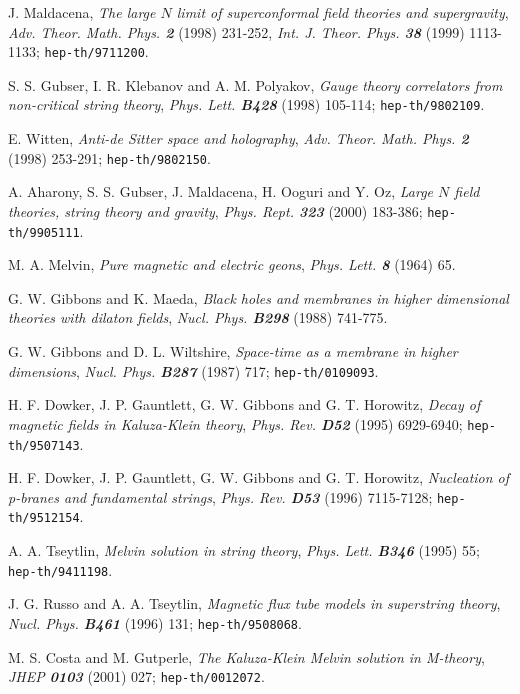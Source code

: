 \documentclass[a4paper,aps,nofootinbib,showpacs,preprint]{revtex4}
\begin{document}
\begin{thebibliography}{99}
    J. Maldacena,
    {\sl The large $N$ limit of superconformal field theories and
         supergravity},
    {\it Adv. Theor. Math. Phys. \bf 2} (1998) 231-252,
    {\it Int. J. Theor. Phys. \bf 38} (1999) 1113-1133;
    {\tt hep-th/9711200}.

    S. S. Gubser, I. R. Klebanov and A. M. Polyakov,
    {\sl Gauge theory correlators from non-critical string theory},
    {\it Phys. Lett. \bf B428} (1998) 105-114;
    {\tt hep-th/9802109}.

    E. Witten,
    {\sl Anti-de Sitter space and holography},
    {\it Adv. Theor. Math. Phys. \bf 2} (1998) 253-291;
    {\tt hep-th/9802150}.

    A. Aharony, S. S. Gubser, J. Maldacena, H. Ooguri and Y. Oz,
    {\sl Large $N$ field theories, string theory and gravity},
    {\it Phys. Rept. \bf 323} (2000) 183-386;
    {\tt hep-th/9905111}.

    M. A. Melvin,
    {\sl Pure magnetic and electric geons},
    {\it Phys. Lett. \bf 8} (1964) 65.

    G. W. Gibbons and K. Maeda,
    {\sl Black holes and membranes in higher dimensional theories
         with dilaton fields},
    {\it Nucl. Phys. \bf B298} (1988) 741-775.

    G. W. Gibbons and D. L. Wiltshire,
    {\sl Space-time as a membrane in higher dimensions},
    {\it Nucl. Phys. \bf B287} (1987) 717;
    {\tt hep-th/0109093}.

    H. F. Dowker, J. P. Gauntlett, G. W. Gibbons and G. T. Horowitz,
    {\sl Decay of magnetic fields in Kaluza-Klein theory},
    {\it Phys. Rev. \bf D52} (1995) 6929-6940;
    {\tt hep-th/9507143}.

    H. F. Dowker, J. P. Gauntlett, G. W. Gibbons and G. T. Horowitz,
    {\sl Nucleation of p-branes and fundamental strings},
    {\it Phys. Rev. \bf D53} (1996) 7115-7128;
    {\tt hep-th/9512154}.

    A. A. Tseytlin,
    {\sl Melvin solution in string theory},
    {\it Phys. Lett. \bf B346} (1995) 55;
    {\tt hep-th/9411198}.

    J. G. Russo and A. A. Tseytlin,
    {\sl Magnetic flux tube models in superstring theory},
    {\it Nucl. Phys. \bf B461} (1996) 131;
    {\tt hep-th/9508068}.

    M. S. Costa and M. Gutperle,
    {\sl The Kaluza-Klein Melvin solution in M-theory},
    {\it JHEP \bf 0103} (2001) 027;
    {\tt hep-th/0012072}.


\end{thebibliography}
\end{document}
